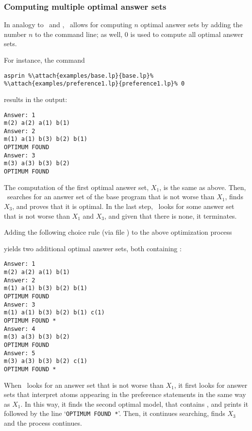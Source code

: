 \subsubsection{Computing multiple optimal answer sets}

In analogy to \clasp\ and \clingo, 
\asprin\ allows for computing $n$ optimal answer sets by adding the number $n$ to the command line;
as well, $0$ is used to compute all optimal answer sets. 

\begin{example}
For instance, the command
%
\begin{lstlisting}[numbers=none,escapechar=\%]
asprin %\attach{examples/base.lp}{base.lp}% %\attach{examples/preference1.lp}{preference1.lp}% 0
\end{lstlisting}
%
results in the output:
%
\begin{lstlisting}[numbers=none]
Answer: 1
m(2) a(2) a(1) b(1)
Answer: 2
m(1) a(1) b(3) b(2) b(1)
OPTIMUM FOUND
Answer: 3
m(3) a(3) b(3) b(2)
OPTIMUM FOUND
\end{lstlisting}
%
The computation of the first optimal answer set, $X_1$, is the same as above.
Then, \asprin\ searches for an answer set of the base program that is not worse than $X_1$, 
finds $X_3$, and proves that it is optimal. 
In the last step, \asprin\ looks for some answer set that is not worse than $X_1$ and $X_3$,  
and given that there is none, it terminates. 

Adding the following choice rule 
(via file )
to the above optimization process
%

%
yields two additional optimal answer sets, both containing : 
%
%
\begin{lstlisting}[numbers=none]
Answer: 1
m(2) a(2) a(1) b(1)
Answer: 2
m(1) a(1) b(3) b(2) b(1)
OPTIMUM FOUND
Answer: 3
m(1) a(1) b(3) b(2) b(1) c(1)
OPTIMUM FOUND *
Answer: 4
m(3) a(3) b(3) b(2)
OPTIMUM FOUND
Answer: 5
m(3) a(3) b(3) b(2) c(1)
OPTIMUM FOUND *
\end{lstlisting}
%
When \asprin\ looks for an answer set that is not worse than $X_1$,  
it first looks for answer sets that interpret atoms appearing in the preference statements
in the same way as $X_1$. 
In this way,
it finds the second optimal model, that contains , 
and prints it followed by the line `\lstinline{OPTIMUM FOUND *}'.  
Then, it continues searching, finds $X_3$ and the process continues. 


\end{example}
